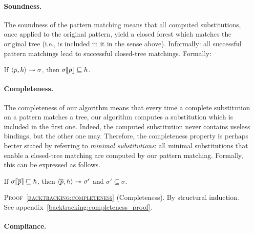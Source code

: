 \paragraph{Soundness.}

The soundness of the pattern matching means that all computed
substitutions, once applied to the original pattern, yield a closed
forest which matches the original tree (i.e., is included in it in the
sense above). Informally: all successful pattern matchings lead to
successful closed\hyp{}tree matchings. Formally:
\begin{theorem}[Soundness]\hfill
\label{backtracking:soundness}
\begin{center}
If \(\smat{h}{\overline{p}} \twoheadrightarrow \sigma\),
then \(\subst{\overline{p}}{\sigma} \sqsubseteq h\).
\end{center}
\end{theorem}

\medskip



\paragraph{Completeness.}

The completeness of our algorithm means that every time a complete
substitution on a pattern matches a tree, our algorithm computes a
substitution which is included in the first one. Indeed, the computed
substitution never contains useless bindings, but the other one
may. Therefore, the completeness property is perhaps better stated by
referring to \emph{minimal substitutions}: all minimal substitutions
that enable a closed\hyp{}tree matching are computed by our pattern
matching. Formally, this can be expressed as follows.
\begin{theorem}[Completeness]\hfill
\label{backtracking:completeness}
\begin{center}
If   \(\subst{\overline{p}}{\sigma} \sqsubseteq h\),
then \(\smat{h}{\overline{p}} \twoheadrightarrow \sigma'\) 
and  \(\sigma' \subseteq \sigma\).
\end{center}
\end{theorem}

\medskip

\noindent\textsc{Proof~\ref{backtracking:completeness}}
(Completeness). By structural induction. See
appendix~\ref{backtracking:completeness_proof}.


\paragraph{Compliance.}

